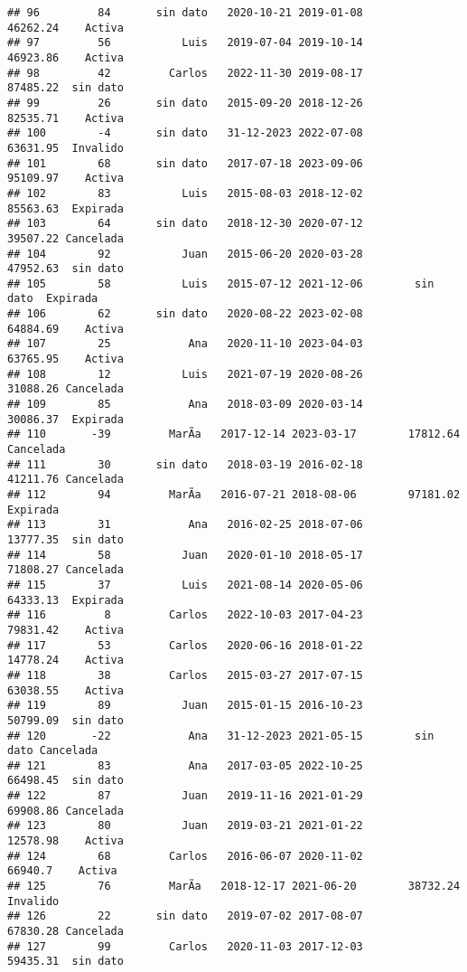 \documentclass[
]{article}
\begin{document}
\begin{verbatim}
## 96         84       sin dato   2020-10-21 2019-01-08        46262.24    Activa
## 97         56           Luis   2019-07-04 2019-10-14        46923.86    Activa
## 98         42         Carlos   2022-11-30 2019-08-17        87485.22  sin dato
## 99         26       sin dato   2015-09-20 2018-12-26        82535.71    Activa
## 100        -4       sin dato   31-12-2023 2022-07-08        63631.95  Invalido
## 101        68       sin dato   2017-07-18 2023-09-06        95109.97    Activa
## 102        83           Luis   2015-08-03 2018-12-02        85563.63  Expirada
## 103        64       sin dato   2018-12-30 2020-07-12        39507.22 Cancelada
## 104        92           Juan   2015-06-20 2020-03-28        47952.63  sin dato
## 105        58           Luis   2015-07-12 2021-12-06        sin dato  Expirada
## 106        62       sin dato   2020-08-22 2023-02-08        64884.69    Activa
## 107        25            Ana   2020-11-10 2023-04-03        63765.95    Activa
## 108        12           Luis   2021-07-19 2020-08-26        31088.26 Cancelada
## 109        85            Ana   2018-03-09 2020-03-14        30086.37  Expirada
## 110       -39         MarÃ­a   2017-12-14 2023-03-17        17812.64 Cancelada
## 111        30       sin dato   2018-03-19 2016-02-18        41211.76 Cancelada
## 112        94         MarÃ­a   2016-07-21 2018-08-06        97181.02  Expirada
## 113        31            Ana   2016-02-25 2018-07-06        13777.35  sin dato
## 114        58           Juan   2020-01-10 2018-05-17        71808.27 Cancelada
## 115        37           Luis   2021-08-14 2020-05-06        64333.13  Expirada
## 116         8         Carlos   2022-10-03 2017-04-23        79831.42    Activa
## 117        53         Carlos   2020-06-16 2018-01-22        14778.24    Activa
## 118        38         Carlos   2015-03-27 2017-07-15        63038.55    Activa
## 119        89           Juan   2015-01-15 2016-10-23        50799.09  sin dato
## 120       -22            Ana   31-12-2023 2021-05-15        sin dato Cancelada
## 121        83            Ana   2017-03-05 2022-10-25        66498.45  sin dato
## 122        87           Juan   2019-11-16 2021-01-29        69908.86 Cancelada
## 123        80           Juan   2019-03-21 2021-01-22        12578.98    Activa
## 124        68         Carlos   2016-06-07 2020-11-02         66940.7    Activa
## 125        76         MarÃ­a   2018-12-17 2021-06-20        38732.24  Invalido
## 126        22       sin dato   2019-07-02 2017-08-07        67830.28 Cancelada
## 127        99         Carlos   2020-11-03 2017-12-03        59435.31  sin dato

\end{verbatim}
\end{document}
